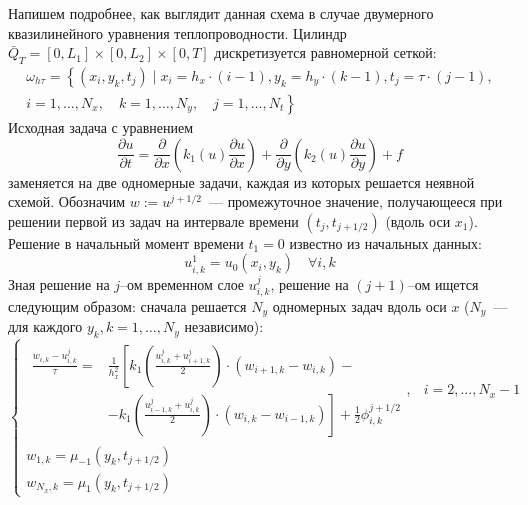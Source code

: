 Напишем подробнее, как выглядит данная схема в случае двумерного квазилинейного уравнения теплопроводности.
Цилиндр $\bar{Q}_T = [0, L_1] \times [0, L_2] \times [0, T]$ дискретизуется равномерной сеткой:
\begin{multline*}
    \omega_{h\tau} = \left\{ 
        (x_i, y_k, t_j) \mid x_i = h_x \cdot (i - 1), y_k = h_y \cdot (k - 1), t_j = \tau \cdot (j - 1),\right.\\
        \left. i = 1,\ldots,N_x,\quad k = 1,\ldots, N_y, \quad j = 1, \ldots, N_t
     \right\}
\end{multline*}
Исходная задача с уравнением
\begin{equation*}
    \frac{\partial u}{\partial t} = \frac{\partial}{\partial x}\left( k_1(u) \frac{\partial u}{\partial x} \right) +
    \frac{\partial}{\partial y} \left( k_2(u) \frac{\partial u}{\partial y} \right) + f
\end{equation*}
заменяется на две одномерные задачи, каждая из которых решается неявной схемой.
Обозначим $w := u^{j + 1/2}$~--- промежуточное значение, получающееся при решении первой из задач на интервале времени $(t_{j}, t_{j + 1/2})$ (вдоль оси $x_1$).
Решение в начальный момент времени $t_1 = 0$ известно из начальных данных:
\begin{equation*}
    u_{i, k}^{1} = u_0(x_i, y_k)\quad \forall i, k
\end{equation*}
Зная решение на $j$--ом временном слое $u_{i, k}^{j}$, решение на $(j + 1)$--ом ищется следующим образом:
сначала решается $N_y$ одномерных задач вдоль оси $x$ ($N_y$~--- для каждого $y_k, k = 1,\ldots,N_y$ независимо):
\begin{equation*}
    \begin{cases}
        \begin{aligned}
            \textstyle\frac{w_{i, k} - u_{i, k}^{j}}{\tau} = &\textstyle \frac{1}{h_x^2} \left[ 
                k_1 \left( 
                    \frac{u_{i, k}^{j} + u_{i + 1, k}^{j}}{2}
                \right) \cdot \left( 
                    w_{i + 1, k} - w_{i, k}
                \right) -
            \right.\\
            &\textstyle \left.
                - k_1 \left( 
                    \frac{u_{i - 1, k}^{j} + u_{i, k}^{j}}{2}
                \right) \cdot \left( 
                    w_{i, k} - w_{i - 1, k}
                \right)
            \right] + \frac{1}{2}\phi_{i, k}^{j + 1/2}
        \end{aligned}, & i = 2, \ldots, N_x - 1\\ 
        w_{1, k} = \mu_{-1}(y_k, t_{j + 1/2})\\
        w_{N_x, k} = \mu_{1}(y_k, t_{j + 1/2})
    \end{cases}
\end{equation*}
